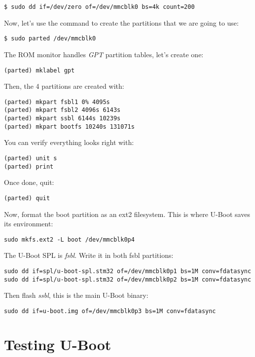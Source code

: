\begin{verbatim}
$ sudo dd if=/dev/zero of=/dev/mmcblk0 bs=4k count=200
\end{verbatim}

Now, let's use the  command to create the partitions that
we are going to use:

\begin{verbatim}
$ sudo parted /dev/mmcblk0
\end{verbatim}

The ROM monitor handles {\em GPT} partition tables, let's create one:

\begin{verbatim}
(parted) mklabel gpt
\end{verbatim}

Then, the 4 partitions are created with:
\begin{verbatim}
(parted) mkpart fsbl1 0% 4095s
(parted) mkpart fsbl2 4096s 6143s
(parted) mkpart ssbl 6144s 10239s
(parted) mkpart bootfs 10240s 131071s
\end{verbatim}

You can verify everything looks right with:

\begin{verbatim}
(parted) unit s
(parted) print
\end{verbatim}

Once done, quit:
\begin{verbatim}
(parted) quit
\end{verbatim}


Now, format the boot partition as an ext2 filesystem. This is where
U-Boot saves its environment:
\begin{verbatim}
sudo mkfs.ext2 -L boot /dev/mmcblk0p4
\end{verbatim}

The U-Boot SPL is {\em fsbl}. Write it in both fsbl partitions:

\begin{verbatim}
sudo dd if=spl/u-boot-spl.stm32 of=/dev/mmcblk0p1 bs=1M conv=fdatasync
sudo dd if=spl/u-boot-spl.stm32 of=/dev/mmcblk0p2 bs=1M conv=fdatasync
\end{verbatim}

Then flash {\em ssbl}, this is the main U-Boot binary:

\begin{verbatim}
sudo dd if=u-boot.img of=/dev/mmcblk0p3 bs=1M conv=fdatasync
\end{verbatim}

\section{Testing U-Boot}

